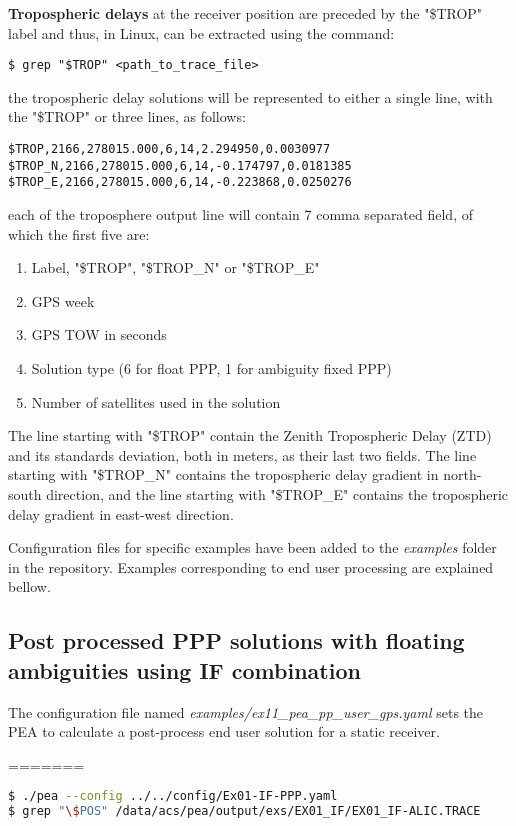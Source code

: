 \textbf{Tropospheric delays} at the receiver position are preceded by the "\$TROP" label and thus, in Linux, can be extracted using the command:
 \begin{verbatim}
$ grep "$TROP" <path_to_trace_file>
\end{verbatim}
the tropospheric delay solutions will be represented to either a single line, with the "\$TROP" or three lines, as follows:
\begin{verbatim}
$TROP,2166,278015.000,6,14,2.294950,0.0030977
$TROP_N,2166,278015.000,6,14,-0.174797,0.0181385
$TROP_E,2166,278015.000,6,14,-0.223868,0.0250276
\end{verbatim}
each of the troposphere output line will contain 7 comma separated field, of which the first five are:
\begin{enumerate}
	\item  Label, "\$TROP", "\$TROP\_N" or "\$TROP\_E"
	\item  GPS week
	\item  GPS TOW in seconds
	\item  Solution type (6 for float PPP, 1 for ambiguity fixed PPP)
	\item  Number of satellites used in the solution
\end{enumerate}
The line starting with "\$TROP" contain the Zenith Tropospheric Delay (ZTD) and its standards deviation, both in meters, as their last two fields.  The line starting with "\$TROP\_N" contains the tropospheric delay gradient in north-south direction, and  the line starting with "\$TROP\_E" contains the tropospheric delay gradient in east-west direction.

Configuration files for specific examples have been added to the \textit{examples} folder in the repository. Examples corresponding to end user processing are explained bellow.

\subsection{Post processed PPP solutions with floating ambiguities using IF combination}
The configuration file named \textit{examples/ex11_pea_pp_user_gps.yaml} sets the PEA to calculate a post-process end user solution for a static receiver. 
 
=======
\begin{lstlisting}[language=bash]
$ ./pea --config ../../config/Ex01-IF-PPP.yaml
$ grep "\$POS" /data/acs/pea/output/exs/EX01_IF/EX01_IF-ALIC.TRACE
\end{lstlisting}

